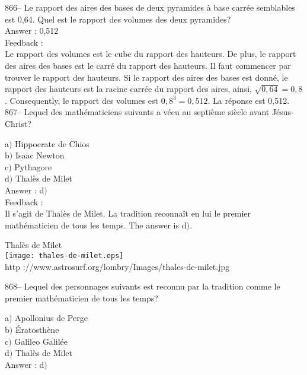 \documentclass[letterpaper, 12pt]{article}
\begin{document}
866-- Le rapport des aires des bases de deux pyramides \`a base carr\'ee
semblables est 0,64.  Quel est le rapport des volumes des deux pyramides?\\

Answer : 0,512\\

Feedback : \\
Le rapport des volumes est le cube du rapport des hauteurs.  De
plus, le rapport des aires des bases est le carr\'e du rapport des
hauteurs.  Il faut commencer par trouver le rapport des hauteurs.
Si le rapport des aires des bases est donn\'e, le rapport des
hauteurs est la racine carr\'ee du rapport des aires, ainsi,
$\sqrt{0,64}=0,8$.
Consequently, le rapport des volumes est $0,8^{3}=0,512$. La r\'eponse
est 0,512.\\


867-- Lequel des math\'ematiciens suivants a v\'ecu au septi\`eme
si\`ecle avant J\'esus-Christ?

a$)$ Hippocrate de Chios \\
b$)$ Isaac Newton \\
c$)$ Pythagore \\
d$)$ Thal\`es de Milet\\

Answer : d$)$\\

Feedback :\\
Il s'agit de Thal\`es de Milet. La tradition reconna\^it en lui le
premier math\'ematicien de tous les temps. The answer is
d$)$.

    \begin{center}
        Thal\`es de Milet\\
    \texttt{[image: thales-de-milet.eps]}\\
        {\footnotesize http
://www.astrosurf.org/lombry/Images/thales-de-milet.jpg}
    \end{center}

868-- Lequel des personnages suivants est reconnu par la tradition
comme le premier math\'ematicien de tous les temps?

a$)$ Apollonius de Perge \\
b$)$ \'Eratosth\`ene \\
c$)$ Galileo Galil\'ee \\
d$)$ Thal\`es de Milet \\

Answer : d$)$\\
\end{document}
